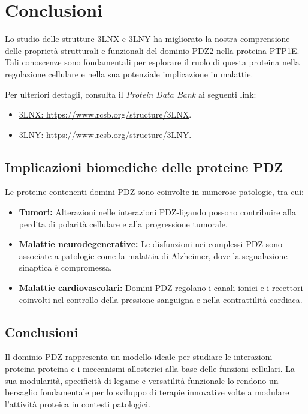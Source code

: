 \documentclass[Lau,binding=0.6cm,oneside,noexaminfo]{sapthesis}
\begin{document}
\section{Conclusioni}
Lo studio delle strutture 3LNX e 3LNY ha migliorato la nostra comprensione delle proprietà strutturali e funzionali del dominio PDZ2 nella proteina PTP1E. Tali conoscenze sono fondamentali per esplorare il ruolo di questa proteina nella regolazione cellulare e nella sua potenziale implicazione in malattie.

Per ulteriori dettagli, consulta il \textit{Protein Data Bank} ai seguenti link:
\begin{itemize}
    \item \href{https://www.rcsb.org/structure/3LNX}{3LNX: https://www.rcsb.org/structure/3LNX}.
    \item \href{https://www.rcsb.org/structure/3LNY}{3LNY: https://www.rcsb.org/structure/3LNY}.
\end{itemize}

\subsection*{Implicazioni biomediche delle proteine PDZ}

Le proteine contenenti domini PDZ sono coinvolte in numerose patologie, tra cui:
\begin{itemize}
    \item \textbf{Tumori:} Alterazioni nelle interazioni PDZ-ligando possono contribuire alla perdita di polarità cellulare e alla progressione tumorale.
    \item \textbf{Malattie neurodegenerative:} Le disfunzioni nei complessi PDZ sono associate a patologie come la malattia di Alzheimer, dove la segnalazione sinaptica è compromessa.
    \item \textbf{Malattie cardiovascolari:} Domini PDZ regolano i canali ionici e i recettori coinvolti nel controllo della pressione sanguigna e nella contrattilità cardiaca.
\end{itemize}

\subsection*{Conclusioni}

Il dominio PDZ rappresenta un modello ideale per studiare le interazioni proteina-proteina e i meccanismi allosterici alla base delle funzioni cellulari. La sua modularità, specificità di legame e versatilità funzionale lo rendono un bersaglio fondamentale per lo sviluppo di terapie innovative volte a modulare l’attività proteica in contesti patologici.
\end{document}
